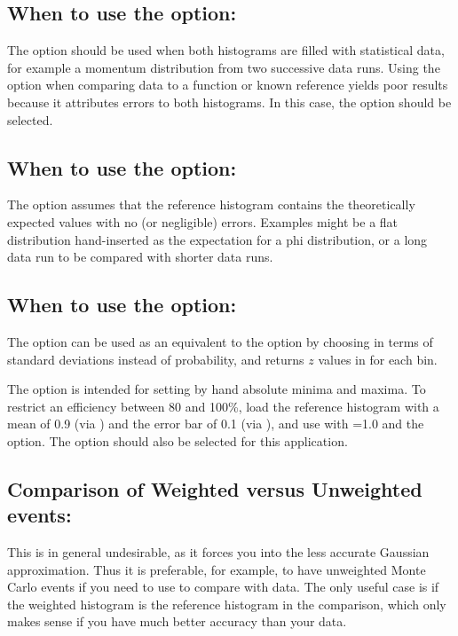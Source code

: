 \subsection*{When to use the \protect{} option:}

The  option should be used when both histograms are filled with
statistical data, for example a momentum distribution from two successive 
data runs.  
Using the  option when comparing data to a function or known 
reference yields poor results because it attributes errors to both histograms. 
In this case, the  option should be selected.

\subsection*{When to use the  option:}

The  option assumes that the reference histogram contains the
theoretically expected values with no (or negligible) errors.  
Examples might be a flat distribution hand-inserted as the expectation 
for a phi distribution, or
a long data run to be compared with shorter data runs.

\subsection*{When to use the  option:}

The  option can be used as an equivalent to the 
option by choosing 
in terms of standard deviations instead of probability, and returns $z$ values
in  for each bin.

The  option is intended for setting by hand absolute minima and maxima.
To restrict an efficiency between 80 and 100\%, load the reference histogram
with a mean of 0.9 (via ) and the error bar of 0.1 (via ),
and use  with \mbox{=1.0} and the  option.  
The  option should also be selected for this application.

\subsection*{Comparison of Weighted versus Unweighted events:}

This is in general undesirable, as it forces you into the less accurate
Gaussian approximation.  
Thus it is preferable, for example, to have unweighted Monte Carlo events 
if you need to use  to compare with data.  
The only useful case is if the weighted histogram is the reference
histogram in the  comparison, which only makes sense if you have much
better accuracy than your data.

